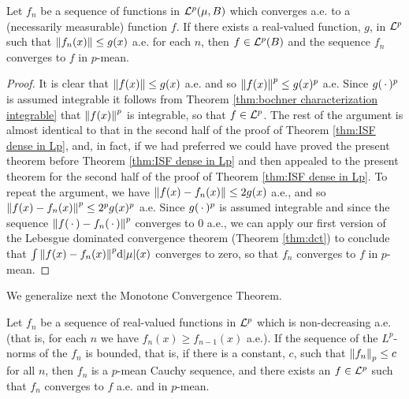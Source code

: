 \begin{theorem}
Let $f_n$ be a sequence of functions in ${\cal L}^p(\mu,B)$ which converges a.e. to a (necessarily measurable) function $f$. If there exists a real-valued function, $g$, in ${\cal L}^p$ such that $\norm{f_n(x)}\leq g(x)$ a.e. for each $n$, then $f\in{\cal L}^p(B)$ and the sequence $f_n$ converges to $f$ in $p$-mean.
\end{theorem}

\begin{proof}
It is clear that $\norm{f(x)}\leq g(x)$ a.e. and so $\norm{f(x)}^p \leq g(x)^p$ a.e. Since $g(\,\cdot\,)^p$ is assumed integrable it follows from Theorem \ref{thm:bochner characterization integrable} that $\norm{f(x)}^p$ is integrable, so that $f\in{\cal L}^p$. The rest of the argument is almost identical to that in the second half of the proof of Theorem \ref{thm:ISF dense in Lp}, and, in fact, if we had preferred we could have proved the present theorem before Theorem \ref{thm:ISF dense in Lp} and then appealed to the present theorem for the second half of the proof of Theorem \ref{thm:ISF dense in Lp}. To repeat the argument, we have $\norm{f(x)-f_n(x)}\leq2g(x)$ a.e., and so $\norm{f(x)-f_n(x)}^p\leq2^pg(x)^p$ a.e. Since $g(\,\cdot\,)^p$ is assumed integrable and since the sequence $\norm{f(\,\cdot\,)-f_n(\,\cdot\,)}^p$ converges to 0 a.e., we can apply our first version of the Lebesgue dominated convergence theorem (Theorem \ref{thm:dct}) to conclude that $\int\norm{f(x)-f_n(x)}^p\dd|\mu|(x)$ converges to zero, so that $f_n$ converges to $f$ in $p$-mean.
\end{proof}

We generalize next the Monotone Convergence Theorem.

\begin{theorem}\label{thm:mct for Lp}
Let $f_n$ be a sequence of real-valued functions in ${\cal L}^p$ which is non-decreasing a.e. (that is, for each $n$ we have $f_n(x)\geq f_{n-1}(x)$ a.e.). If the sequence of the $L^p$-norms of the $f_n$ is bounded, that is, if there is a constant, $c$, such that $\norm{f_n}_p\leq c$ for all $n$, then $f_n$ is a $p$-mean Cauchy sequence, and there exists an $f\in{\cal L}^p$ such that $f_n$ converges to $f$ a.e. and in $p$-mean.
\end{theorem}

